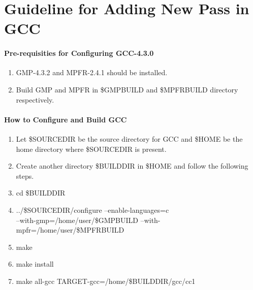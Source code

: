 \appendix
\chapter{Guideline for Adding New Pass in GCC}
\subsubsection*{Pre-requisities for Configuring GCC-4.3.0}
\begin{enumerate}
\item GMP-4.3.2 and MPFR-2.4.1 should be installed.
\item Build GMP and MPFR in \$GMPBUILD and \$MPFRBUILD directory respectively.
\end{enumerate}
\subsubsection*{How to Configure and Build GCC}
\begin{enumerate}
\item Let \$SOURCEDIR be the source directory for GCC and \$HOME be the home directory where \$SOURCEDIR is present.
\item Create another directory \$BUILDDIR in \$HOME and follow the following steps.
\item	cd \$BUILDDIR
\item	../\$SOURCEDIR/configure --enable-languages=c \\
--with-gmp=/home/user/\$GMPBUILD --with-mpfr=/home/user/\$MPFRBUILD
\item make
\item make install
\item make all-gcc TARGET-gcc=/home/\$BUILDDIR/gcc/cc1
\end{enumerate}
